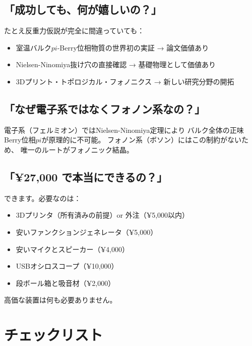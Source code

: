 \documentclass[11pt,a4paper]{article}
\def\pi{pi}%
\def\textbf#1{#1}%
\begin{document}
\subsection{「成功しても、何が嬉しいの？」}

たとえ反重力仮説が完全に間違っていても：
\begin{itemize}
\item \textbf{室温バルク$\pi$-Berry位相物質}の世界初の実証 → 論文価値あり
\item \textbf{Nielsen-Ninomiya抜け穴}の直接確認 → 基礎物理として価値あり
\item \textbf{3Dプリント・トポロジカル・フォノニクス} → 新しい研究分野の開拓
\end{itemize}

\subsection{「なぜ電子系ではなくフォノン系なの？」}

電子系（フェルミオン）ではNielsen-Ninomiya定理により
バルク全体の正味Berry位相$\pi$が\textbf{原理的に不可能}。
フォノン系（ボソン）にはこの制約がないため、
唯一のルートがフォノニック結晶。

\subsection{「¥27,000 で本当にできるの？」}

できます。必要なのは：
\begin{itemize}
\item 3Dプリンタ（所有済みの前提）or 外注（¥5,000以内）
\item 安いファンクションジェネレータ（¥5,000）
\item 安いマイクとスピーカー（¥4,000）
\item USBオシロスコープ（¥10,000）
\item 段ボール箱と吸音材（¥2,000）
\end{itemize}
高価な装置は何も必要ありません。


\section{チェックリスト}
\end{document}
